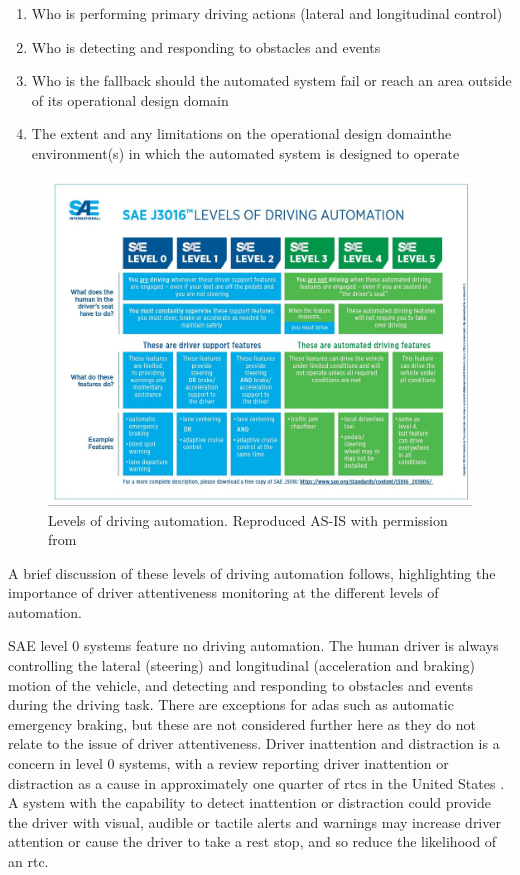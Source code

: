 \documentclass[11pt, parskip=half*,twoside=false]{scrbook}
\begin{document}
\begin{enumerate}
	\item Who is performing primary driving actions (lateral and longitudinal control) 
	\item Who is detecting and responding to obstacles and events
	\item Who is the fallback should the automated system fail or reach an area outside of its operational design domain
	\item The extent and any limitations on the operational design domain\textemdash the environment(s) in which the automated system is designed to operate
\end{enumerate}

\begin{figure} 
	\centering
	\includegraphics[width= \textwidth]{sae_av_levels} 
	\caption{Levels of driving automation. Reproduced AS-IS with permission from \citet{J3016_201806}}
	\label{fig:av_levels}
\end{figure}

A brief discussion of these levels of driving automation follows, highlighting the importance of driver attentiveness monitoring at the different levels of automation. 

SAE level 0 systems feature no driving automation. The human driver is always controlling the lateral (steering) and longitudinal (acceleration and braking) motion of the vehicle, and detecting and responding to obstacles and events during the driving task. There are exceptions for \gls{adas} such as automatic emergency braking, but these are not considered further here as they do not relate to the issue of driver attentiveness. Driver inattention and distraction is a concern in level 0 systems, with a review reporting driver inattention or distraction as a cause in approximately one quarter of \glspl{rtc} in the United States \citep{youngDriverDistraction2007}. A system with the capability to detect inattention or distraction could provide the driver with visual, audible or tactile alerts and warnings may increase driver attention or cause the driver to take a rest stop, and so reduce the likelihood of an \gls{rtc}.
\end{document}

